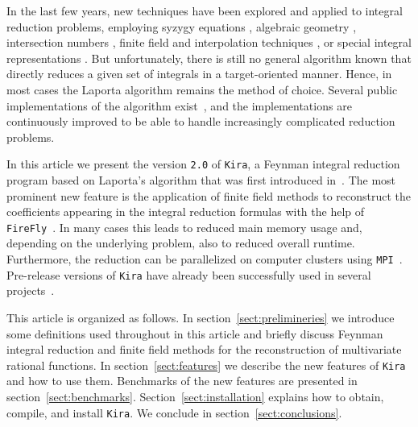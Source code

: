\documentclass[11pt,a4paper,DIV=11,numbers=noenddot,parskip=half]{scrartcl}
\newcommand{\code}[1]{\texttt{#1}}
\newcommand*{\kira}{\code{Kira}}
\newcommand*{\kiraZO}{\code{Kira\;2.0}}
\newcommand*{\firefly}{\code{FireFly}}
\newcommand*{\mpi}{\code{MPI}}
\begin{document}
In the last few years, new techniques have been explored and applied to integral reduction problems, employing
syzygy equations \cite{Gluza:2010ws,Schabinger:2011dz,Ita:2015tya,Boehm:2017wjc,Kosower:2018obg,vonManteuffel:2020vjv},
algebraic geometry \cite{Larsen:2015ped,Boehm:2018fpv,Bendle:2019csk},
intersection numbers \cite{Mastrolia:2018uzb,Frellesvig:2019kgj,Frellesvig:2019uqt,Weinzierl:2020xyy,Frellesvig:2020qot},
finite field and interpolation techniques \cite{vonManteuffel:2014ixa,Peraro:2016wsq,Smirnov:2019qkx,Klappert:2019emp,Peraro:2019svx,Klappert:2020aqs},
or special integral representations \cite{Liu:2017jxz,Liu:2018dmc,Wang:2019mnn,Guan:2019bcx}.
But unfortunately, there is still no general algorithm known that directly reduces a given set of integrals in a target-oriented manner.
Hence, in most cases the Laporta algorithm \cite{Laporta:2001dd} remains the method of choice.
Several public implementations of the algorithm exist~\cite{Anastasiou:2004vj,vonManteuffel:2012np,Smirnov:2014hma,Maierhoefer:2017hyi},
and the implementations are continuously improved to be able to handle increasingly complicated reduction problems.

In this article we present the version \code{2.0} of \kira{}, a Feynman integral reduction program based on Laporta's algorithm that was first introduced in~\cite{Maierhoefer:2017hyi}.
The most prominent new feature is the application of finite field methods to reconstruct the coefficients appearing in the integral reduction formulas with the help of \firefly{}~\cite{Klappert:2019emp,Klappert:2020aqs}.
In many cases this leads to reduced main memory usage and, depending on the underlying problem, also to reduced overall runtime.
Furthermore, the reduction can be parallelized on computer clusters using \mpi{}~\cite{mpi_forum}.
Pre-release versions of \kiraZO{} have already been successfully used in several projects~\cite{Harlander:2018zpi,Artz:2019bpr,Harlander:2020duo}.


This article is organized as follows.
In section~\ref{sect:prelimineries} we introduce some definitions used throughout in this article and briefly discuss Feynman integral reduction and finite field methods for the reconstruction of multivariate rational functions.
In section~\ref{sect:features} we describe the new features of \kiraZO{} and how to use them.
Benchmarks of the new features are presented in section~\ref{sect:benchmarks}.
Section~\ref{sect:installation} explains how to obtain, compile, and install \kira{}.
We conclude in section~\ref{sect:conclusions}.
\end{document}
